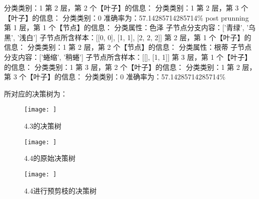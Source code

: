 \documentclass{ctexart}
\begin{document}
\begin{tcolorbox}[colframe = blue, colback = blue!10!white ,  breakable]
        分类类别：1\newline
第 2 层，第 2 个【叶子】的信息：\newline
        分类类别：1\newline
第 2 层，第 3 个【叶子】的信息：\newline
        分类类别：0\newline
准确率为：57.14285714285714\%\newline
post prunning\newline
第 1 层，第 1 个【节点】的信息：\newline
        分类属性：色泽\newline
        子节点分支内容：['青绿', '乌黑', '浅白']\newline
        子节点所含样本：[[0, 0], [1, 1], [2, 2, 2]]\newline
第 2 层，第 1 个【叶子】的信息：\newline
        分类类别：1\newline
第 2 层，第 2 个【节点】的信息：\newline
        分类属性：根蒂\newline
        子节点分支内容：['蜷缩', '稍蜷']\newline
        子节点所含样本：[[], [1, 1]]\newline
第 3 层，第 1 个【叶子】的信息：\newline
        分类类别：1\newline
第 3 层，第 2 个【叶子】的信息：\newline
        分类类别：1\newline
第 2 层，第 3 个【叶子】的信息：\newline
        分类类别：0\newline
准确率为：57.14285714285714\%
\end{tcolorbox}
所对应的决策树为：

\begin{figure}[htbp]
    \centering
    \label{fig:}
    \texttt{[image: ]}
    \caption{4.3的决策树}
\end{figure}


\begin{figure}[htbp]
    \centering
    \label{fig:}
    \texttt{[image: ]}
    \caption{4.4的原始决策树}
\end{figure}


\begin{figure}[htbp]
    \centering
    \label{fig:}
    \texttt{[image: ]}
    \caption{4.4进行预剪枝的决策树}
\end{figure}
\end{document}

